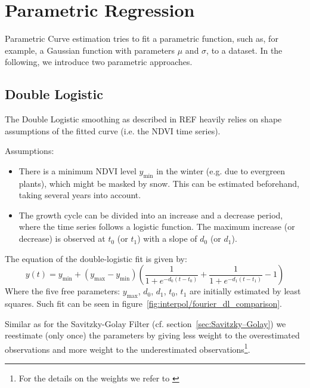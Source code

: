 
\section{Parametric Regression} 
	\label{sec:itpl_parametric}
	Parametric Curve estimation tries to fit a parametric function, such as, for example, a Gaussian function with parameters $\mu$ and $\sigma$, to a dataset. In the following, we introduce two parametric approaches.

	\subsection{Double Logistic}
		\label{sec:double_logistic}
		The Double Logistic smoothing as described in \cite{beckImprovedMonitoringVegetation2006}REF heavily relies on shape assumptions of the fitted curve (i.e. the NDVI time series).

		Assumptions:
		\begin{itemize}
			\item There is a minimum NDVI level $y_{\min}$ in the winter (e.g. due to evergreen plants), which might be masked by snow. This can be estimated beforehand, taking several years into account.
			\item The growth cycle can be divided into an increase and a decrease period, where the time series follows a logistic function. The maximum increase (or decrease) is observed at $t_0$ (or $t_1$) with a slope of $d_0$ (or $d_1$).
		\end{itemize}

		The equation of the double-logistic fit is given by:
		\begin{equation*}
			y(t) = y_{\min} + \left(y_{\max}-y_{\min}\right)\left(\frac{1}{1+e^{-d_0(t-t_0)}}+\frac{1}{1+e^{-d_1(t-t_1)}}-1\right)
		\end{equation*}
		Where the five free parameters: $y_{\max}$, $d_0$, $d_1$, $t_0$, $t_1$ are initially estimated by least squares. Such fit can be seen in figure~\ref{fig:interpol/fourier_dl_comparison}.

		Similar as for the Savitzky-Golay Filter (cf. section~\ref{sec:Savitzky–Golay}) we reestimate (only once) the parameters by giving less weight to the overestimated observations and more weight to the underestimated observations\footnote{For the details on the weights we refer to \cite{beckImprovedMonitoringVegetation2006}}.

